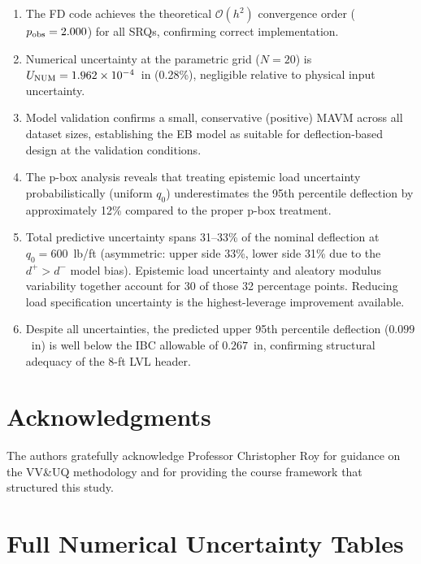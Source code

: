 \documentclass[10pt,twocolumn]{article}
\begin{document}
\begin{enumerate}[leftmargin=*, itemsep=2pt]
  \item The FD code achieves the theoretical $\mathcal{O}(h^2)$
    convergence order ($p_{\rm obs}=2.000$) for all SRQs, confirming
    correct implementation.
  \item Numerical uncertainty at the parametric grid ($N=20$) is
    $U_{\rm NUM}=1.962\times10^{-4}$~in (0.28\%), negligible relative
    to physical input uncertainty.
  \item Model validation confirms a small, conservative (positive) MAVM
    across all dataset sizes, establishing the EB model as suitable
    for deflection-based design at the validation conditions.
  \item The p-box analysis reveals that treating epistemic load uncertainty
    probabilistically (uniform $q_0$) underestimates the 95th percentile
    deflection by approximately 12\% compared to the proper p-box treatment.
  \item Total predictive uncertainty spans 31--33\% of the nominal deflection
    at $q_0=600$~lb/ft (asymmetric: upper side 33\%, lower side 31\%
    due to the $d^+>d^-$ model bias).
    Epistemic load uncertainty and aleatory modulus variability together
    account for 30 of those 32 percentage points.
    Reducing load specification uncertainty is the highest-leverage
    improvement available.
  \item Despite all uncertainties, the predicted upper 95th percentile
    deflection ($0.099$~in) is well below the IBC allowable of $0.267$~in,
    confirming structural adequacy of the 8-ft LVL header.
\end{enumerate}

\section*{Acknowledgments}

The authors gratefully acknowledge Professor Christopher Roy for
guidance on the VV\&UQ methodology and for providing the course
framework that structured this study.

\appendix

\section{Full Numerical Uncertainty Tables}
\label{app:unum}
\end{document}
